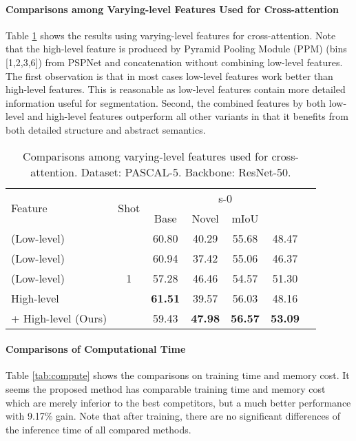 \documentclass[journal]{IEEEtran}
\begin{document}
\paragraph{Comparisons among Varying-level Features Used for Cross-attention}
Table \ref{tab:feat_effect} shows the results using varying-level features for cross-attention.
Note that the high-level feature is produced by Pyramid Pooling Module (PPM) (bins [1,2,3,6]) from PSPNet \cite{zhao2017pyramid} and concatenation without combining low-level features.
The first observation is that in most cases low-level features work better than high-level features.
This is reasonable as low-level features contain more detailed information useful for segmentation.
Second, the combined features by both low-level and high-level features outperform all other variants in that it benefits from both detailed structure and abstract semantics.


\begin{table}[ht]
    \centering
    \caption{Comparisons among varying-level features used for cross-attention. Dataset: PASCAL-5. Backbone: ResNet-50.}
    \begin{adjustbox}{max width=0.48\textwidth}
    \begin{tabular}{l|c|ccccc}
    \hline
         \multirow{2}{*}{Feature} & \multirow{2}{*}{Shot} & \multicolumn{4}{c}{s-0} \\
         \cline{3-6}
          & & Base & Novel & mIoU &  \\
         \hline
          (Low-level) & \multirow{5}{*}{1} & 60.80 & 40.29 & 55.68 & 48.47 \\
          (Low-level) & & 60.94 & 37.42 & 55.06 & 46.37 \\
          (Low-level) & & 57.28 & 46.46 & 54.57 & 51.30 \\
         High-level & & \textbf{61.51} & 39.57 & 56.03 & 48.16 \\
          + High-level (Ours) & & 59.43 & \textbf{47.98} & \textbf{56.57} & \textbf{53.09} \\
    \hline
    \end{tabular}
    \end{adjustbox}
    \label{tab:feat_effect}
\end{table}

\paragraph{Comparisons of Computational Time}
Table \ref{tab:compute} shows the comparisons on training time and memory cost.
It seems the proposed method has comparable training time and memory cost which are merely inferior to the best competitors, but a much better  performance with 9.17\% gain.
Note that after training, there are no significant differences of the inference time of all compared methods.
\end{document}
